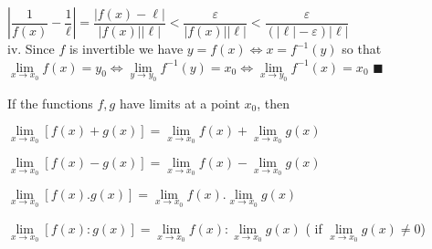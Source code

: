 \documentclass[11pt]{amsbook}
\begin{document}
$\left \lvert \dfrac{1}{f(x)} - \dfrac{1}{\ell}  \right \rvert = \dfrac{\left \lvert f(x) - \ell \right \rvert}{\left \lvert f(x) \right \rvert \left \lvert \ell \right \rvert} < \dfrac{\varepsilon}{\left \lvert f(x) \right \rvert \left \lvert \ell \right \rvert} < \dfrac{\varepsilon}{(\left \lvert \ell \right \rvert - \varepsilon)\left \lvert \ell \right \rvert} $\\

\indent iv. Since $f$ is invertible we have $y = f(x) \Longleftrightarrow x = f^{-1}(y)$ so that \\ 

$\lim\limits_{x \to x_{0}} f(x) = y_{0} \Longleftrightarrow \lim\limits_{y \to y_{0}} f^{-1}(y) = x_{0} \Longleftrightarrow \lim\limits_{x \to y_{0}} f^{-1}(x) = x_{0}$   $\blacksquare$\\ 

\begin{thm}
 If the functions $f, g$ have limits at a point $x_{0}$, then \\
\begin{hEnumerateRoman}
\item $\lim\limits_{x \to x_{0}} [ f(x) + g(x) ] = \lim\limits_{x \to x_{0}} f(x) +  \lim\limits_{x \to x_{0}} g(x) $ \\

\item $\lim\limits_{x \to x_{0}} [ f(x) - g(x) ] = \lim\limits_{x \to x_{0}} f(x) -  \lim\limits_{x \to x_{0}} g(x) $ \\

\item $\lim\limits_{x \to x_{0}} [ f(x) . g(x) ] = \lim\limits_{x \to x_{0}} f(x) .  \lim\limits_{x \to x_{0}} g(x) $ \\

\item $\lim\limits_{x \to x_{0}} [ f(x) : g(x) ] = \lim\limits_{x \to x_{0}} f(x) :  \lim\limits_{x \to x_{0}} g(x) $ ( if $\lim\limits_{x \to x_{0}} g(x) \neq 0 $)\\
\end{hEnumerateRoman}
\end{thm}
\end{document}
